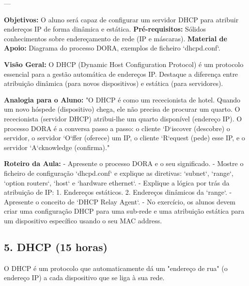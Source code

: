 \documentclass[10pt,a4paper]{article}
\newcommand{\guia}[1]{%
	\begin{tcolorbox}[
		colback=lightgray,
		colframe=darkblue,
		boxrule=1pt,
		arc=4mm,
		title=\textbf{Guia do Formador},
		fonttitle=\bfseries,
		coltitle=darkblue,
		boxsep=5pt,
		left=5mm, right=5mm, top=3mm, bottom=3mm
		]
		#1
	\end{tcolorbox}
}
\begin{document}
	---
	
	\guia{
		\textbf{Objetivos:} O aluno será capaz de configurar um servidor DHCP para atribuir endereços IP de forma dinâmica e estática.
		\textbf{Pré-requisitos:} Sólidos conhecimentos sobre endereçamento de rede (IP e máscaras).
		\textbf{Material de Apoio:} Diagrama do processo DORA, exemplos de ficheiro `dhcpd.conf`.
		
		\textbf{Visão Geral:} O DHCP (Dynamic Host Configuration Protocol) é um protocolo essencial para a gestão automática de endereços IP. Destaque a diferença entre atribuição dinâmica (para novos dispositivos) e estática (para servidores).
		
		\textbf{Analogia para o Aluno:} "O DHCP é como um rececionista de hotel. Quando um novo hóspede (dispositivo) chega, ele não precisa de procurar um quarto. O rececionista (servidor DHCP) atribui-lhe um quarto disponível (endereço IP). O processo DORA é a conversa passo a passo: o cliente `D`iscover (descobre) o servidor, o servidor `O`ffer (oferece) um IP, o cliente `R`equest (pede) esse IP, e o servidor `A`cknowledge (confirma)."
		
		\textbf{Roteiro da Aula:}
		- Apresente o processo DORA e o seu significado.
		- Mostre o ficheiro de configuração `dhcpd.conf` e explique as diretivas: `subnet`, `range`, `option routers`, `host` e `hardware ethernet`.
		- Explique a lógica por trás da atribuição de IP: 1. Endereços estáticos. 2. Endereços dinâmicos da `range`.
		- Apresente o conceito de `DHCP Relay Agent`.
		- No exercício, os alunos devem criar uma configuração DHCP para uma sub-rede e uma atribuição estática para um dispositivo específico usando o seu MAC address.
	}
	\subsection*{5. DHCP (15 horas)}
	\vspace{-1em}
	\paragraph{}
	O DHCP é um protocolo que automaticamente dá um "endereço de rua" (o endereço IP) a cada dispositivo que se liga à sua rede.
	
\end{document}
